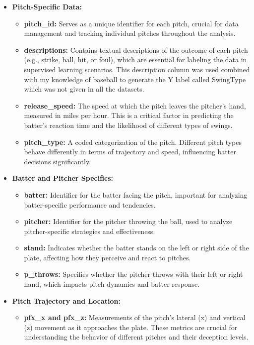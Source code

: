 \documentclass[12pt]{article}
\begin{document}
\begin{itemize}
    \item \textbf{Pitch-Specific Data:}
    \begin{itemize}
        \item \textbf{pitch\_id:} Serves as a unique identifier for each pitch, crucial for data management and tracking individual pitches throughout the analysis.
        \item \textbf{descriptions:} Contains textual descriptions of the outcome of each pitch (e.g., strike, ball, hit, or foul), which are essential for labeling the data in supervised learning scenarios. This description column was used combined with my knowledge of baseball to generate the Y label called SwingType which was not given in all the datasets.
        \item \textbf{release\_speed:} The speed at which the pitch leaves the pitcher’s hand, measured in miles per hour. This is a critical factor in predicting the batter’s reaction time and the likelihood of different types of swings.
        \item \textbf{pitch\_type:} A coded categorization of the pitch. Different pitch types behave differently in terms of trajectory and speed, influencing batter decisions significantly.
    \end{itemize}
    \item \textbf{Batter and Pitcher Specifics:}
    \begin{itemize}
        \item \textbf{batter:} Identifier for the batter facing the pitch, important for analyzing batter-specific performance and tendencies.
        \item \textbf{pitcher:} Identifier for the pitcher throwing the ball, used to analyze pitcher-specific strategies and effectiveness.
        \item \textbf{stand:} Indicates whether the batter stands on the left or right side of the plate, affecting how they perceive and react to pitches.
        \item \textbf{p\_throws:} Specifies whether the pitcher throws with their left or right hand, which impacts pitch dynamics and batter response.
    \end{itemize}
    \item \textbf{Pitch Trajectory and Location:}
    \begin{itemize}
        \item \textbf{pfx\_x and pfx\_z:} Measurements of the pitch’s lateral (x) and vertical (z) movement as it approaches the plate. These metrics are crucial for understanding the behavior of different pitches and their deception levels.

\end{itemize}
\end{itemize}
\end{document}
